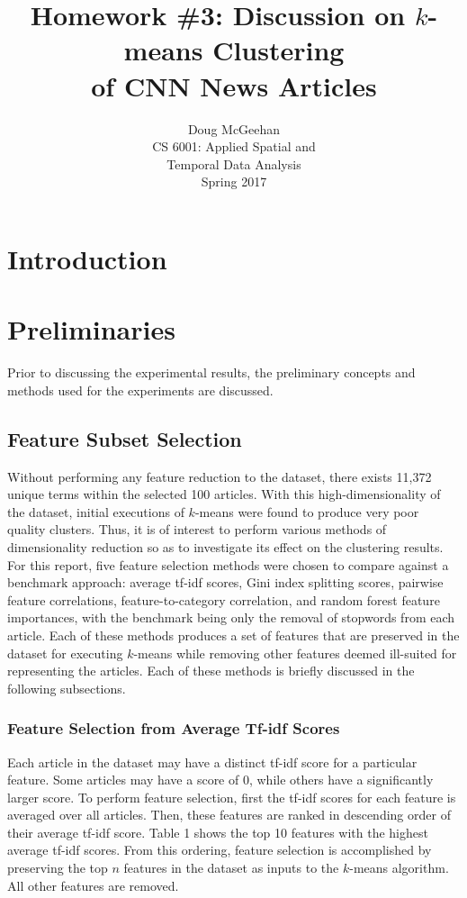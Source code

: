 \documentclass[11pt]{article}
\title{Homework \#3: Discussion on $k$-means Clustering\\ of CNN News Articles}
\author{Doug McGeehan\\
		CS 6001: Applied Spatial and \\ Temporal Data Analysis\\
		Spring 2017}
\begin{document}
\maketitle

\section{Introduction}

\section{Preliminaries}

Prior to discussing the experimental results, the preliminary concepts and methods used for the experiments are discussed.

\subsection{Feature Subset Selection} \label{sec:feature_selection}

Without performing any feature reduction to the dataset, there exists 11,372 unique terms within the selected 100 articles.
With this high-dimensionality of the dataset, initial executions of $k$-means were found to produce very poor quality clusters.
Thus, it is of interest to perform various methods of dimensionality reduction so as to investigate its effect on the clustering results.
For this report, five feature selection methods were chosen to compare against a benchmark approach: average tf-idf scores, Gini index splitting scores, pairwise feature correlations, feature-to-category correlation, and random forest feature importances, with the benchmark being only the removal of stopwords from each article.
Each of these methods produces a set of features that are preserved in the dataset for executing $k$-means while removing other features deemed ill-suited for representing the articles.
Each of these methods is briefly discussed in the following subsections.

\subsubsection{Feature Selection from Average Tf-idf Scores}

Each article in the dataset may have a distinct tf-idf score for a particular feature.
Some articles may have a score of 0, while others have a significantly larger score.
To perform feature selection, first the tf-idf scores for each feature is averaged over all articles.
Then, these features are ranked in descending order of their average tf-idf score.
Table 1 shows the top 10 features with the highest average tf-idf scores.
From this ordering, feature selection is accomplished by preserving the top $n$ features in the dataset as inputs to the $k$-means algorithm.
All other features are removed.
\end{document}
